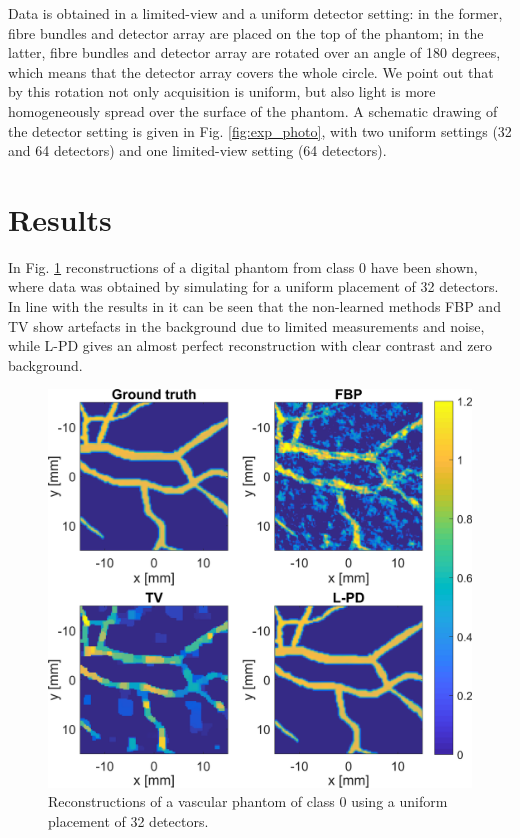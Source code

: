\documentclass[journal]{IEEEtran}
\begin{document}
Data is obtained in a limited-view and a uniform detector setting: in the former, fibre bundles and detector array are placed on the top of the phantom; in the latter, fibre bundles and detector array are rotated over an angle of 180 degrees, which means that the detector array covers the whole circle. We point out that by this rotation not only acquisition is uniform, but also light is more homogeneously spread over the surface of the phantom. A schematic drawing of the detector setting is given in Fig. \ref{fig:exp_photo}, with two uniform settings (32 and 64 detectors) and one limited-view setting (64 detectors).

\section{Results}\label{sec:results}
In Fig. \ref{fig:plain_result} reconstructions of a digital phantom from class 0 have been shown, where data was obtained by simulating for a uniform placement of 32 detectors. In line with the results in \cite{Adler2018} it can be seen that the non-learned methods FBP and TV show artefacts in the background due to limited measurements and noise, while L-PD gives an almost perfect reconstruction with clear contrast and zero background.

\begin{figure}[ht!]
\centering
\includegraphics[width=0.9\linewidth]{images/paper_plain_results.png}
\caption{Reconstructions of a vascular phantom of class 0 using a uniform placement of 32 detectors.}
\label{fig:plain_result}
\vspace{-3mm}
\end{figure}
\end{document}
